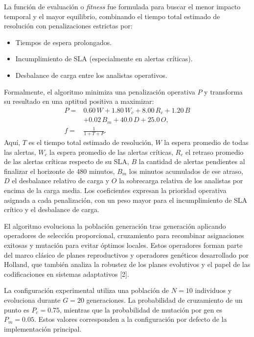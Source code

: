 \documentclass[12pt,a4paper,twocolumn]{article}
\begin{document}
La función de evaluación o \textit{fitness} fue formulada para buscar el menor impacto temporal y el mayor equilibrio, combinando el tiempo total estimado de resolución con penalizaciones estrictas por:
\begin{itemize}
    \item Tiempos de espera prolongados.
    \item Incumplimiento de SLA (especialmente en alertas críticas).
    \item Desbalance de carga entre los analistas operativos.
\end{itemize}

Formalmente, el algoritmo minimiza una penalización operativa $P$ y transforma su resultado en una aptitud positiva a maximizar:
\begin{equation}
\begin{aligned}
P ={}& 0.60\,W + 1.80\,W_c + 8.00\,R_c + 1.20\,B \\
  &+ 0.02\,B_m + 40.0\,D + 25.0\,O, \\
f ={}& \frac{1}{1 + T + P}.
\end{aligned}
\end{equation}
Aquí, $T$ es el tiempo total estimado de resolución, $W$ la espera promedio de todas las alertas, $W_c$ la espera promedio de las alertas críticas, $R_c$ el retraso promedio de las alertas críticas respecto de su SLA, $B$ la cantidad de alertas pendientes al finalizar el horizonte de 480 minutos, $B_m$ los minutos acumulados de ese atraso, $D$ el desbalance relativo de carga y $O$ la sobrecarga relativa de los analistas por encima de la carga media. Los coeficientes expresan la prioridad operativa asignada a cada penalización, con un peso mayor para el incumplimiento de SLA crítico y el desbalance de carga.

El algoritmo evoluciona la población generación tras generación aplicando operadores de selección proporcional, cruzamiento para recombinar asignaciones exitosas y mutación para evitar óptimos locales. Estos operadores forman parte del marco clásico de planes reproductivos y operadores genéticos desarrollado por Holland, que también analiza la robustez de los planes evolutivos y el papel de las codificaciones en sistemas adaptativos [2].

La configuración experimental utiliza una población de $N=10$ individuos y evoluciona durante $G=20$ generaciones. La probabilidad de cruzamiento de un punto es $P_c=0.75$, mientras que la probabilidad de mutación por gen es $P_m=0.05$. Estos valores corresponden a la configuración por defecto de la implementación principal.
\end{document}
